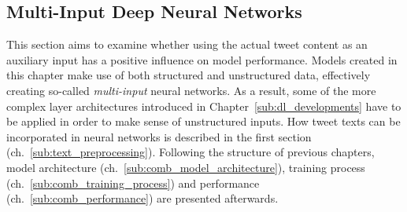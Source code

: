 \subsection{Multi-Input Deep Neural Networks}
\label{sec:deep_combined}

This section aims to examine whether using the actual tweet content as an
auxiliary input has a positive influence on model performance.
Models created in this chapter make use of both structured and unstructured data,
effectively creating so-called \textit{multi-input} neural networks.
As a result, some of the more complex layer architectures introduced in Chapter~\ref{sub:dl_developments}
have to be applied in order to make sense of unstructured inputs.
How tweet texts can be incorporated in neural networks is described in the
first section (ch.~\ref{sub:text_preprocessing}).
Following the structure of previous chapters, model architecture (ch.~\ref{sub:comb_model_architecture}),
training process (ch.~\ref{sub:comb_training_process}) and performance (ch.~\ref{sub:comb_performance})
are presented afterwards.









